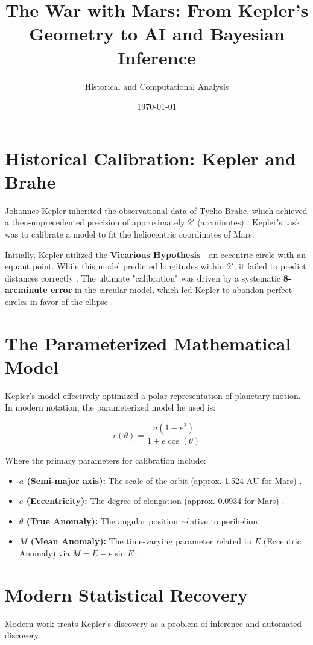 \documentclass[11pt]{article}
\title{The War with Mars: From Kepler's Geometry to AI and Bayesian Inference}
\author{Historical and Computational Analysis}
\date{\today}
\begin{document}
\maketitle

\section{Historical Calibration: Kepler and Brahe}
Johannes Kepler inherited the observational data of Tycho Brahe, which achieved a then-unprecedented precision of approximately $2'$ (arcminutes) \cite{1.2.7}. Kepler's task was to calibrate a model to fit the heliocentric coordinates of Mars. 

Initially, Kepler utilized the \textbf{Vicarious Hypothesis}---an eccentric circle with an equant point. While this model predicted longitudes within $2'$, it failed to predict distances correctly \cite{1.2.8}. The ultimate "calibration" was driven by a systematic \textbf{8-arcminute error} in the circular model, which led Kepler to abandon perfect circles in favor of the ellipse \cite{1.2.1, 1.2.8}.

\section{The Parameterized Mathematical Model}
Kepler's model effectively optimized a polar representation of planetary motion. In modern notation, the parameterized model he used is:

\begin{equation}
r(\theta) = \frac{a(1 - e^2)}{1 + e \cos(\theta)}
\end{equation}

Where the primary parameters for calibration include:
\begin{itemize}
    \item \textbf{$a$ (Semi-major axis):} The scale of the orbit (approx. 1.524 AU for Mars) \cite{1.2.1}.
    \item \textbf{$e$ (Eccentricity):} The degree of elongation (approx. 0.0934 for Mars) \cite{1.5.7}.
    \item \textbf{$\theta$ (True Anomaly):} The angular position relative to perihelion.
    \item \textbf{$M$ (Mean Anomaly):} The time-varying parameter related to $E$ (Eccentric Anomaly) via $M = E - e \sin E$ \cite{1.2.1}.
\end{itemize}

\section{Modern Statistical Recovery}
Modern work treats Kepler's discovery as a problem of inference and automated discovery.
\end{document}
